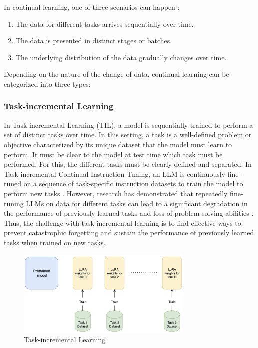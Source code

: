 In continual learning, one of three scenarios can happen \cite{van2022three}:
\begin{enumerate}
\item The data for different tasks arrives sequentially over time.
\item The data is presented in distinct stages or batches.
\item The underlying distribution of the data gradually changes over time.
\end{enumerate}
Depending on the nature of the change of data, continual learning can be categorized into three types:
\subsubsection{Task-incremental Learning}
In Task-incremental Learning (TIL), a model is sequentially trained to perform a set of distinct tasks over time. In this setting, a task is a well-defined problem or objective characterized by its unique dataset that the model must learn to perform. It must be clear to the model at test time which task must be performed. For this, the different tasks must be clearly defined and separated. In Task-incremental Continual Instruction Tuning, an LLM is continuously fine-tuned on a sequence of task-specific instruction datasets to train the model to perform new tasks \cite{wu2024continual}.  However, research has demonstrated that repeatedly fine-tuning LLMs on data for different tasks can lead to a significant degradation in the performance of previously learned tasks and loss of problem-solving abilities \cite{kotha2023understanding}. Thus, the challenge with task-incremental learning is to find effective ways to prevent catastrophic forgetting and sustain the performance of previously learned tasks when trained on new tasks.
\begin{figure}[h]
    \centering
    \includegraphics[width=0.75\textwidth]{Figures/literature_review/task_incremental_learning.jpeg} 
    \caption{Task-incremental Learning}
    \label{fig:TaskIncrementalLearning}
\end{figure}

